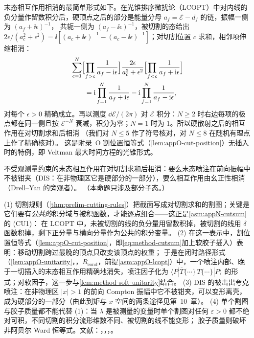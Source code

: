 末态相互作用相消的最简单形式如下。在光锥排序微扰论（LCOPT）中对内线的负分量作留数积分后，硬顶点之后的部分是能量分母 $a_f=\mathcal E-d_f$ 的链，振幅一侧为 $(a_f+\ii\epsilon)^{-1}$，
共轭一侧为 $(a_f-\ii\epsilon)^{-1}$，被切割的态给出 $2\epsilon/(a_c^2+\epsilon^2)=\ii[(a_c+\ii\epsilon)^{-1}-(a_c-\ii\epsilon)^{-1}]$；对切割位置 $c$ 求和，相邻项伸缩相消：
\begin{equation}\label{eq:method-cutsum}
\begin{aligned}
&\sum_{c=1}^{N}\Bigl[\prod_{f>c}\frac{1}{a_f-\mathrm{i}\epsilon}\Bigr]\frac{2\epsilon}{a_c^2+\epsilon^2}\Bigl[\prod_{f<c}\frac{1}{a_f+\mathrm{i}\epsilon}\Bigr]\\
&\qquad=\mathrm{i}\prod_{f=1}^{N}\frac{1}{a_f+\mathrm{i}\epsilon}-\mathrm{i}\prod_{f=1}^{N}\frac{1}{a_f-\mathrm{i}\epsilon} ,
\end{aligned}
\end{equation}
对每个 $\epsilon>0$ 精确成立。再以测度 $\dd\mathcal E/(2\pi)$ 对 $\mathcal E$ 积分：$N\ge2$ 时右边每项的极点都在同一侧且按 $\mathcal E^{-N}$ 衰减，积分为零；$N=1$ 时为 $1$。所以硬散射之后的相互作用在对切割求和后相消
（我们对 $N\le5$ 作了符号核对，对 $N\le8$ 在随机有理点上作了精确核对）。%
这是附录~O 割位置恒等式（\cref{lem:appO-cut-position}）无插入时的特例，即 Veltman 最大时间方程的光锥形式。

\begin{proposition}\label{prop:method-fsi}
不受观测量约束的末态相互作用在对切割求和后相消：要么末态喷注在前向振幅中不被钳夹（DIS：在非物理区它是硬部分的一部分），要么相互作用由幺正性相消（Drell--Yan 的旁观者）。
（本命题只涉及部分子态。）
\end{proposition}

\begin{proofsketch}
(1) 切割规则（\cref{thm:prelim-cutting-rules}）把截面写成对切割求和的割图；关键是它们要有\emph{公共的}积分域与被积函数，才能逐点组合——这正是\cref{asm:appN-cutsum}的 (CU1)：
在 LCOPT 中，未被切割的线的负分量用留数积掉，被切割的线用 $\delta$ 函数积掉，剩下正分量与横向分量作为公共的积分变量。
(2) 在这一表示中，割位置恒等式（\cref{lem:appO-cut-position}，即\cref{eq:method-cutsum}加上软胶子插入）表明：移动切割跨过最晚的顶点只改变该顶点的权重；
于是在闭时路径形式（\cref{lem:appO-unitarity}，\tagR，$R_{\mathrm{cond}}$，前提\cref{asm:appO-lcopt}）中，一个喷注内部、晚于一切插入的末态相互作用精确地消失，喷注因子化为
$\langle P|\bar T\{\cdots\}\,T\{\cdots\}|P\rangle$ 的形式；对软因子，这一步与\cref{lem:method-soft-unitarity}结合。
(3) DIS 的被击出夸克喷注：在非物理区 $|x|>1$ 的前向 Compton 振幅中它不被钳夹，可以变形离壳，成为硬部分的一部分（由此到矩与 $x$ 空间的两条途径见第~10~章）。
(4) 单个割图与胶子质量都不能代替 (1)：当 $\lambda$ 是被测量的变量时单个割图对任何 $\varepsilon>0$ 都不绝对可积，不同切割的积分流形维数不同、被切割的线不能变形；
胶子质量则破坏非阿贝尔 Ward 恒等式。文献：\cite{LibbySterman1978a}，\cite{CollinsSoperSterman1988}，\cite[第~14.4~节]{Collins2011}，\cite{AybatSterman2009}。
\end{proofsketch}

